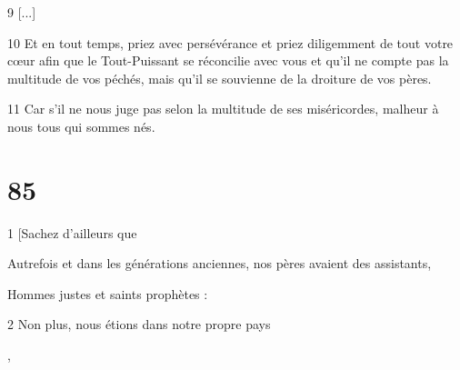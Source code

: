 \par 9 [...]

\par 10 Et en tout temps, priez avec persévérance et priez diligemment de tout votre cœur afin que le Tout-Puissant se réconcilie avec vous et qu'il ne compte pas la multitude de vos péchés, mais qu'il se souvienne de la droiture de vos pères.

\par 11 Car s'il ne nous juge pas selon la multitude de ses miséricordes, malheur à nous tous qui sommes nés.

\chapter{85}

\par 1 [Sachez d'ailleurs que

\par Autrefois et dans les générations anciennes, nos pères avaient des assistants,

\par Hommes justes et saints prophètes :

\par 2 Non plus, nous étions dans notre propre pays

\par [Et ils nous ont aidés quand nous avons péché],


